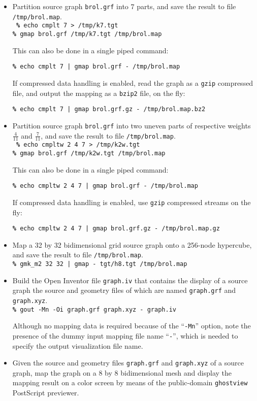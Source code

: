 \begin{itemize}
\item
Partition source graph {\tt brol.grf} into $7$ parts, and save the
result to file {\tt /tmp/brol.map}.
\\

\noi
{\tt
{\bf\%} echo cmplt 7 > /tmp/k7.tgt\\
{\bf\%} gmap brol.grf /tmp/k7.tgt /tmp/brol.map
}
\spa

\noi
This can also be done in a single piped command:

{\tt {\bf\%} echo cmplt 7 | gmap brol.grf - /tmp/brol.map}
\spa

\noi
If compressed data handling is enabled, read the graph as a {\tt gzip}
compressed file, and output the mapping as a {\tt bzip2} file, on the fly:

{\tt {\bf\%} echo cmplt 7 | gmap brol.grf.gz - /tmp/brol.map.bz2}
\item
Partition source graph {\tt brol.grf} into two uneven parts of
respective weights $\frac{4}{11}$ and $\frac{7}{11}$, and save
the result to file {\tt /tmp/brol.map}.
\\

\noi
{\tt
{\bf\%} echo cmpltw 2 4 7 > /tmp/k2w.tgt\\
{\bf\%} gmap brol.grf /tmp/k2w.tgt /tmp/brol.map
}
\spa

\noi
This can also be done in a single piped command:

{\tt {\bf\%} echo cmpltw 2 4 7 | gmap brol.grf - /tmp/brol.map}
\spa

\noi
If compressed data handling is enabled, use {\tt gzip} compressed
streams on the fly:

{\tt {\bf\%} echo cmpltw 2 4 7 | gmap brol.grf.gz - /tmp/brol.map.gz}
\item
Map a 32 by 32 bidimensional grid source graph onto a 256-node hypercube, and
save the result to file {\tt /tmp/brol.map}.
\\

\noi
{\tt {\bf\%} gmk\_m2 32 32 | gmap - tgt/h8.tgt /tmp/brol.map}
\item
Build the {\sc Open Inventor} file {\tt graph.iv} that contains
the display of a source graph the source and geometry files of which
are named {\tt graph.grf} and {\tt graph.xyz}.
\\

\noi
{\tt {\bf\%} gout -Mn -Oi graph.grf graph.xyz - graph.iv}
\spa

\noi
Although no mapping data is required because of the ``{\tt -Mn}'' option,
note the presence of the dummy input mapping file name ``{\tt -}'', which is
needed to specify the output visualization file name.
\item
Given the source and geometry files {\tt graph.grf} and {\tt graph.xyz} of
a source graph, map the graph on a 8 by 8 bidimensional mesh and display
the mapping result on a color screen by means of the public-domain
{\tt ghostview} PostScript previewer.
\\


\end{itemize}
